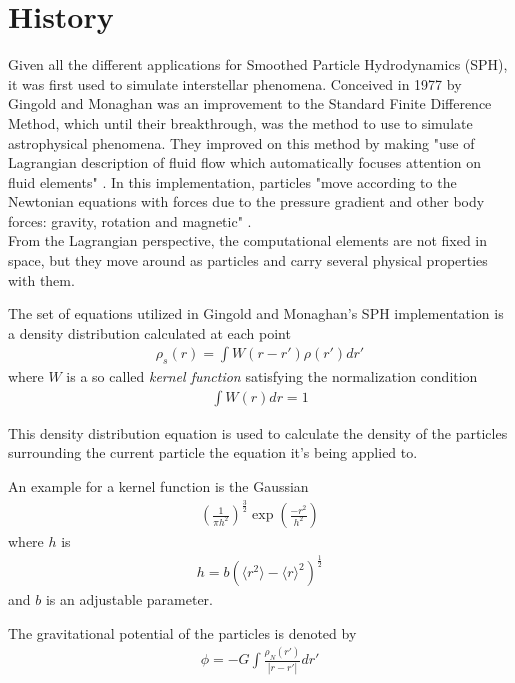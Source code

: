 \documentclass{sigchi}
\begin{document}
\section{History}
%
Given all the different applications for Smoothed Particle Hydrodynamics (SPH),
it was first used to simulate interstellar phenomena. Conceived in 1977 by Gingold and 
Monaghan was an improvement to the Standard Finite Difference Method, which until their 
breakthrough, was the method to use to simulate astrophysical phenomena. They improved 
on this method by making "use of Lagrangian description of fluid flow which automatically 
focuses attention on fluid elements" \cite{sphastrophysics}. In this implementation, particles 
"move according to the Newtonian equations with forces due to the pressure gradient and 
other body forces: gravity, rotation and magnetic" \cite{sphastrophysics}. \\
From the Lagrangian perspective, the computational elements are not fixed in space, but they move around as particles and carry several physical properties with them.
\par\medskip
The set of equations utilized in Gingold and Monaghan's SPH implementation 
is a density distribution calculated at each point
\begin{align}
	\rho_s(r) = \int W(r - r') \rho(r') dr'
\end{align}
where $W$ is a so called \emph{kernel function} satisfying the normalization condition
\begin{align}
	\int W(r) dr = 1
	\label{math:kernelnormal}
\end{align}
%
\par\medskip
This density distribution equation is used to calculate the density of the 
particles surrounding the current particle the equation it's being applied to.
\par\medskip
%
An example for a kernel function is the Gaussian
\begin{align}
 \left( \frac{1}{\pi h^2} \right)^\frac{3}{2}  \exp{(\frac{-r^2}{h^2})}
\end{align}
where $h$ is
\begin{align}
h = b( \langle r^2 \rangle - \langle r \rangle^2)^\frac{1}{2}
\end{align}
and $b$ is an adjustable parameter.
\par\medskip
%
The gravitational potential of the particles is denoted by
\begin{align}
\phi = - G \int \frac{\rho_N(r')}{|r - r'|} dr'
\end{align}
\end{document}

